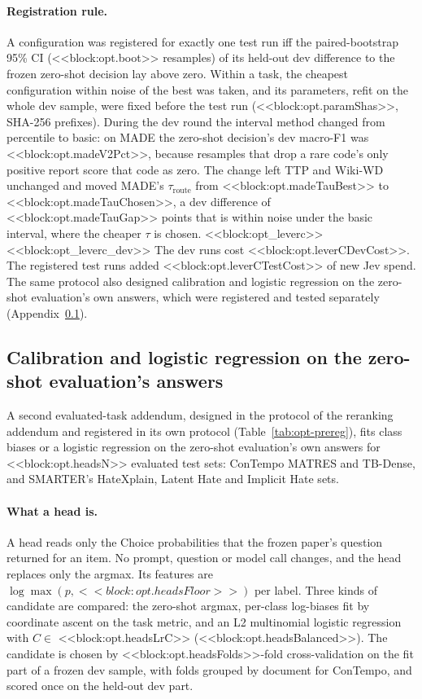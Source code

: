 \paragraph{Registration rule.}
A configuration was registered for exactly one test run iff the paired-bootstrap 95\% CI (<<block:opt.boot>> resamples) of its held-out dev difference to the frozen zero-shot decision lay above zero. Within a task, the cheapest configuration within noise of the best was taken, and its parameters, refit on the whole dev sample, were fixed before the test run (<<block:opt.paramShas>>, SHA-256 prefixes). During the dev round the interval method changed from percentile to basic: on MADE the zero-shot decision's dev macro-F1 was <<block:opt.madeV2Pct>>, because resamples that drop a rare code's only positive report score that code as zero. The change left TTP and Wiki-WD unchanged and moved MADE's $\tau_{\text{route}}$ from <<block:opt.madeTauBest>> to <<block:opt.madeTauChosen>>, a dev difference of <<block:opt.madeTauGap>> points that is within noise under the basic interval, where the cheaper $\tau$ is chosen.
<<block:opt_leverc>>
<<block:opt_leverc_dev>>
The dev runs cost <<block:opt.leverCDevCost>>. The registered test runs added <<block:opt.leverCTestCost>> of new Jev spend. The same protocol also designed calibration and logistic regression on the zero-shot evaluation's own answers, which were registered and tested separately (Appendix~\ref{app:opt-heads}).

\subsection{Calibration and logistic regression on the zero-shot evaluation's answers}\label{app:opt-heads}
A second evaluated-task addendum, designed in the protocol of the reranking addendum and registered in its own protocol (Table~\ref{tab:opt-prereg}), fits class biases or a logistic regression on the zero-shot evaluation's own answers for <<block:opt.headsN>> evaluated test sets: ConTempo MATRES and TB-Dense, and SMARTER's HateXplain, Latent Hate and Implicit Hate sets.

\paragraph{What a head is.}
A head reads only the Choice probabilities that the frozen paper's question returned for an item. No prompt, question or model call changes, and the head replaces only the argmax. Its features are $\log\max(p, <<block:opt.headsFloor>>)$ per label. Three kinds of candidate are compared: the zero-shot argmax, per-class log-biases fit by coordinate ascent on the task metric, and an L2 multinomial logistic regression with $C \in$ <<block:opt.headsLrC>> (<<block:opt.headsBalanced>>). The candidate is chosen by <<block:opt.headsFolds>>-fold cross-validation on the fit part of a frozen dev sample, with folds grouped by document for ConTempo, and scored once on the held-out dev part.

